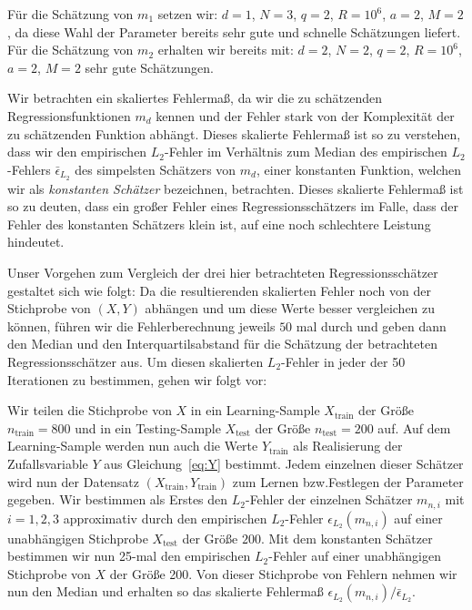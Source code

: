 Für die Schätzung von $m_1$ setzen wir: $d = 1$, $N = 3$, $q = 2$, $R = 10^6$, $a = 2$, $M = 2$, da diese Wahl der Parameter bereits sehr gute und schnelle Schätzungen liefert. Für die Schätzung von $m_2$ erhalten wir bereits mit: $d = 2$, $N = 2$, $q = 2$, $R = 10^6$, $a = 2$, $M = 2$ sehr gute Schätzungen.

Wir betrachten ein skaliertes Fehlermaß, da wir die zu schätzenden Regressionsfunktionen $m_d$ kennen und der Fehler stark von der Komplexität der zu schätzenden Funktion abhängt.  Dieses skalierte Fehlermaß ist so zu verstehen, dass wir den empirischen $L_2$-Fehler im Verhältnis zum Median des empirischen $L_2$-Fehlers $\bar{\epsilon}_{L_2}$ des simpelsten Schätzers von $m_d$, einer konstanten Funktion, welchen wir als \textit{konstanten Schätzer} bezeichnen, betrachten. Dieses skalierte Fehlermaß ist so zu deuten, dass ein großer Fehler eines Regressionsschätzers im Falle, dass der Fehler des konstanten Schätzers klein ist, auf eine noch schlechtere Leistung hindeutet.

Unser Vorgehen zum Vergleich der drei hier betrachteten Regressionsschätzer gestaltet sich wie folgt:
Da die resultierenden skalierten Fehler noch von der Stichprobe von $(X, Y)$ abhängen und um diese Werte besser vergleichen zu können, führen wir die Fehlerberechnung jeweils $50$ mal durch und geben dann den Median und den Interquartilsabstand für die Schätzung der betrachteten Regressionsschätzer aus.
Um diesen skalierten $L_2$-Fehler in jeder der 50 Iterationen zu bestimmen, gehen wir folgt vor:

Wir teilen die Stichprobe von $X$ in ein Learning-Sample $X_{\text{train}}$ der Größe $n_{\text{train}} = 800$ und in ein Testing-Sample $X_{\text{test}}$ der Größe $n_{\text{test}} = 200$ auf.
Auf dem Learning-Sample werden nun auch die Werte $Y_{\text{train}}$ als Realisierung der Zufallsvariable $Y$ aus Gleichung~\eqref{eq:Y} bestimmt. Jedem einzelnen dieser Schätzer wird nun der Datensatz $(X_{\text{train}},Y_{\text{train}})$ zum Lernen bzw.\@ Festlegen der Parameter gegeben. Wir bestimmen als Erstes den $L_2$-Fehler der einzelnen Schätzer  $m_{n,i}$ mit $i = 1,2,3$ approximativ durch den empirischen $L_2$-Fehler $\epsilon_{L_2}(m_{n,i})$ auf einer unabhängigen Stichprobe $X_{\text{test}}$ der Größe $200.$ Mit dem konstanten Schätzer bestimmen wir nun 25-mal den empirischen $L_2$-Fehler auf einer unabhängigen Stichprobe von $X$ der Größe 200.
Von dieser Stichprobe von Fehlern nehmen wir nun den Median und erhalten so das skalierte Fehlermaß $\epsilon_{L_2}(m_{n,i}) / \bar{\epsilon}_{L_2}.$

